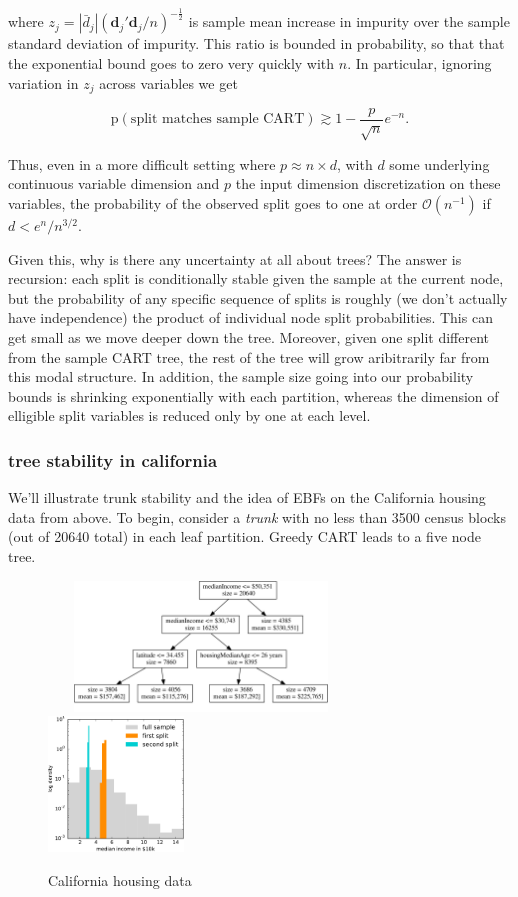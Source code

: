 \documentclass{article}
\begin{document}
where
$z_j = \left|\bar{d}_j\right|\left(\mathbf{d}_j'\mathbf{d}_j/n\right)^{-\frac{1}{2}}$
is sample mean increase in impurity over the sample standard deviation
of impurity. This ratio is bounded in probability, so that that the
exponential bound goes to zero very quickly with $n$. In particular,
ignoring variation in $z_j$ across variables we get

\[
\mathrm{p}\left(\text{split matches sample CART}\right) \gtrsim 1 - \frac{p}{\sqrt{n}} e^{-n}.
\]

Thus, even in a more difficult setting where $p \approx n\times d$, with
$d$ some underlying continuous variable dimension and $p$ the input
dimension discretization on these variables, the probability of the
observed split goes to one at order $\mathcal{O}(n^{-1})$ if
$d < e^{n}/n^{3/2}$.

Given this, why is there any uncertainty at all about trees? The answer
is recursion: each split is conditionally stable given the sample at the
current node, but the probability of any specific sequence of splits is
roughly (we don't actually have independence) the product of individual
node split probabilities. This can get small as we move deeper down the
tree. Moreover, given one split different from the sample CART tree, the
rest of the tree will grow aribitrarily far from this modal structure.
In addition, the sample size going into our probability bounds is
shrinking exponentially with each partition, whereas the dimension of
elligible split variables is reduced only by one at each level.

\subsubsection{tree stability in california}\label{tree-stability-in-california}

We'll illustrate trunk stability and the idea of EBFs on the California
housing data from above. To begin, consider a \emph{trunk} with no less
than 3500 census blocks (out of 20640 total) in each leaf partition.
Greedy CART leads to a five node tree.

\begin{figure}
~~~
\includegraphics[width=0.6\textwidth]{../graphs/ca_trunk}
~~~~~~
\includegraphics[width=0.32\textwidth]{../graphs/ca_splits}
\caption{California housing data}
\end{figure}
\end{document}
